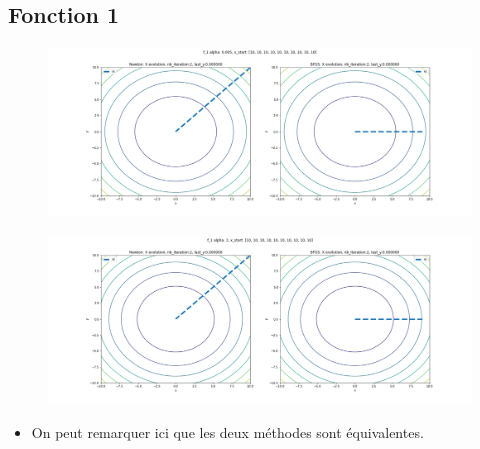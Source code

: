 \documentclass[twoside,10pt,a4paper]{article}
\numberwithin{equation}{section}					%
\numberwithin{figure}{section}						%
\begin{document}
\subsection{Fonction 1 }\label{sec:subsection2}
\begin{figure}[H]
    \centering
    \includegraphics[width=\textwidth]{imgs/comparaison/f_1_a-0.005.png}
    \caption{}
\end{figure}
\begin{figure}[H]
    \centering
    \includegraphics[width=\textwidth]{imgs/comparaison/f_1_a-3.png}
    \caption{}
\end{figure}
\begin{itemize}
	\item On peut remarquer ici que les deux méthodes sont équivalentes.
\end{itemize}
\end{document}
